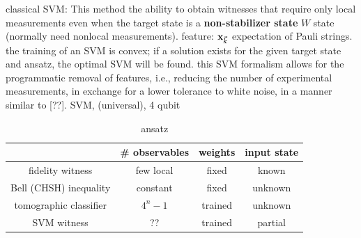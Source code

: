 \documentclass[
reprint,
aps,
pra,
]{revtex4-2}
\theoremstyle{plain}
\theoremstyle{definition}
\begin{document}
classical SVM: 
\cite{zhuMachineLearningDerivedEntanglement2021}
This method the ability to obtain witnesses that require only local measurements even when the target state is a \textbf{non-stabilizer state} $W$ state (normally need nonlocal measurements).
feature: $\vb{x}_{\vec{k}}$ expectation of Pauli strings.
the training of an SVM is convex; if a solution exists for the given target state and ansatz, the optimal SVM will be found.
this SVM formalism allows for the programmatic removal of features, i.e., reducing the number of experimental measurements, in exchange for a lower tolerance to white noise, in a manner similar to [??].
SVM, (universal), 4 qubit \cite{vintskevichClassificationFourqubitEntangled2022}



\begin{table}[!ht]
	\centering
	\begin{tabular}{c|c|c|c}
		& \# observables & weights & input state \\
		\hline
		fidelity  witness & few local & fixed & known  \\  
		Bell (CHSH) inequality & constant & fixed & unknown \\  
		tomographic classifier \cite{maTransformingBellInequalities2018} & $4^n-1$ & trained & unknown \\  
		SVM witness & ?? & trained & partial \\  
		\hline
	\end{tabular}
	\caption{ansatz}
\end{table}
\end{document}
